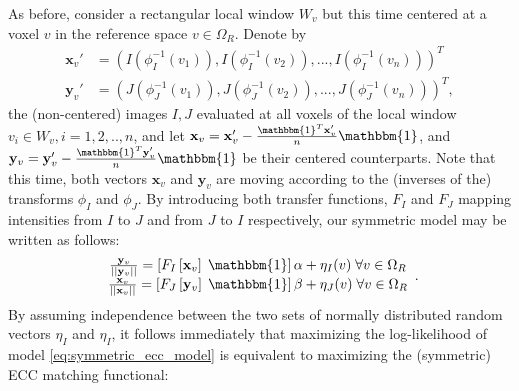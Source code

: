 
As before, consider a rectangular local window $W_{v}$ but this time centered at a voxel $v$ in the reference space $v\in\Omega_{R}$. Denote by
\begin{align*}
    \mathbf{x}_{v}' &= \left(I(\phi_{I}^{-1}(v_{1})), I(\phi_{I}^{-1}(v_{2})), ..., I(\phi_{I}^{-1}(v_{n}))\right)^{T}\\
    \mathbf{y}_{v}' &= \left(J(\phi_{J}^{-1}(v_{1})), J(\phi_{J}^{-1}(v_{2})), ..., J(\phi_{J}^{-1}(v_{n}))\right)^{T},
\end{align*}
the (non-centered) images $I, J$ evaluated at all voxels of the local window $v_{i}\in W_{v}, i=1, 2, .., n$, and let $\mathbf{x}_{v} = \mathbf{x}_{v}' - \frac{\mathbbm{1}^{T}\mathbf{x}_{v}'}{n}\mathbbm{1}$, and $\mathbf{y}_{v} = \mathbf{y}_{v}' - \frac{\mathbbm{1}^{T}\mathbf{y}_{v}'}{n}\mathbbm{1}$ be their centered counterparts. Note that this time, both vectors $\mathbf{x}_{v}$ and $\mathbf{y}_{v}$ are moving according to the (inverses of the) transforms $\phi_{I}$ and $\phi_{J}$. By introducing both transfer functions, $F_{I}$ and $F_{J}$ mapping intensities from $I$ to $J$ and from $J$ to $I$ respectively, our symmetric model may be written as follows:
\begin{equation}\label{eq:symmetric_ecc_model}
    \begin{array}{ccccc}
        \frac{\mathbf{y}_{v}}{||\mathbf{y}_{v}||} = \left[F_{I}\left[\mathbf{x}_{v}\right] \; \mathbbm{1}\right]\alpha + \eta_{I}(v) \; \forall v\in\Omega_{R}\\
        \frac{\mathbf{x}_{v}}{||\mathbf{x}_{v}||} = \left[F_{J}\left[\mathbf{y}_{v}\right] \; \mathbbm{1}\right]\beta + \eta_{J}(v) \; \forall v\in\Omega_{R}\\
    \end{array}.
\end{equation}
By assuming independence between the two sets of normally distributed random vectors $\eta_{I}$ and $\eta_{I}$, it follows immediately that maximizing the log-likelihood of model \eqref{eq:symmetric_ecc_model} is equivalent to maximizing the (symmetric) ECC matching functional:
